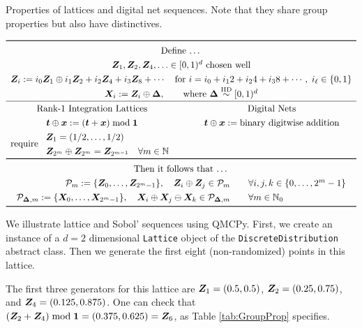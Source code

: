 \documentclass[graybox,footinfo]{svmult}
\newcommand{\IID}{\textup{IID}}
\newcommand{\IIDsim}{\overset{\IID}{\sim}}
\begin{document}
\begin{table}
	\centering
	\caption{Properties of lattices and digital net sequences.  Note that they share group properties but also have distinctives.} \label{tab:GroupProp}
\[
	\renewcommand{\arraystretch}{1.3}
\begin{array}{c@{\qquad}c}
	\toprule
	\multicolumn{2}{c}{\text{Define \ldots}} \\
	\multicolumn{2}{c}{\bsZ_1, \bsZ_2, \bsZ_4, \ldots \in [0,1)^d \text{ chosen well} } \\
	\multicolumn{2}{c}{
	\bsZ_{i} := i_0  \bsZ_1 \oplus i_1 \bsZ_{2} + i_2  \bsZ_{4} +  i_3  \bsZ_{8} + \cdots 
	\quad
	\text{for }i = i_0 +i_1 2 + i_2 4 + i_3 8 + \cdots, \; i_\ell \in \{0,1\}} \\
    \multicolumn{2}{c}{\bsX_i := \bsZ_i \oplus \bsDelta, \qquad \text{where }\bsDelta \IIDsim [0,1)^d} \\  \hline
	\text{Rank-1 Integration Lattices} & \text{Digital Nets} \\
		\bst \oplus \bsx : = (\bst + \bsx) \bmod \bsone & \bst \oplus \bsx := \text{binary digitwise addition} \\ 
		 \text{require } \begin{array}{l} \bsZ_1 = (1/2, \ldots, 1/2) \\
		 	\bsZ_{2^{m}} \oplus \bsZ_{2^{m}} = \bsZ_{2^{m-1}} \quad \forall m \in \bbN \end{array}
		\\
\toprule
\multicolumn{2}{c}{\text{Then it follows that \ldots}} \\
	\multicolumn{2}{c}{\begin{array}{r}
			\calP_m := \{\bsZ_0, \ldots, \bsZ_{2^m-1}\}, \quad
			\bsZ_i \oplus \bsZ_j \in \calP_m \\
			\calP_{\bsDelta,m} := \{\bsX_0, \ldots, \bsX_{2^m-1}\}, \quad
			\bsX_i \oplus \bsX_j \ominus \bsX_k \in \calP_{\bsDelta,m}
	\end{array} \quad \begin{array}{l}\forall  i,j,k \in \{0, \ldots, 2^{m} -1\} \\ \forall m \in \bbN_0\end{array}} \\
\bottomrule
\end{array}
\]
\end{table}

We illustrate lattice and Sobol' sequences using QMCPy. First, we create an instance of a $d=2$ dimensional \texttt{Lattice} object of the  \texttt{DiscreteDistribution} abstract class. Then we generate the first eight (non-randomized) points in this lattice. 

The first three generators for this lattice are ${\boldsymbol{Z}}_1 = (0.5, 0.5)$, ${\boldsymbol{Z}}_2 = (0.25, 0.75)$, and ${\boldsymbol{Z}}_4 = (0.125, 0.875)$.  One can check that $({\boldsymbol{Z}}_2 + {\boldsymbol{Z}}_4) \bmod {\boldsymbol{1}} = (0.375, 0.625) = {\boldsymbol{Z}}_6$, as Table \ref{tab:GroupProp} specifies.
\end{document}

